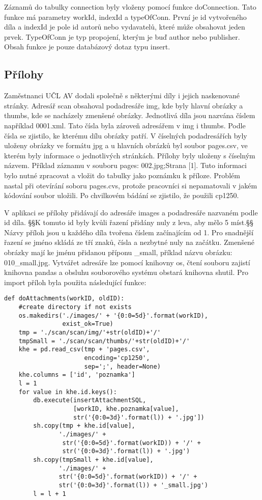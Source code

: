             Záznamů do tabulky connection byly vloženy pomocí funkce doConnection. Tato funkce má parametry workId, indexId a typeOfConn. První je id vytvořeného díla a indexId je pole id autorů nebo vydavatelů, které může obsahovat jeden prvek. TypeOfConn je typ propojení, kterým je buď author nebo publisher. Obsah funkce je pouze databázový dotaz typu insert.
            
        \subsection{Přílohy}
            Zaměstnanci UČL AV dodali společně s některými díly i jejich naskenované stránky. Adresář scan obsahoval  podadresáře img, kde byly hlavní obrázky a thumbs, kde se nacházely zmenšené obrázky. Jednotlivá díla jsou nazvána číslem například 0001.xml. Tato čísla byla zároveň adresářem v img i thumbs. Podle čísla se zjistilo, ke kterému dílu obrázky patří. V číselných podadresářích byly uloženy obrázky ve formátu jpg a u hlavních obrázků byl soubor pages.csv, ve kterém byly informace o jednotlivých stránkách. Přílohy byly uloženy s číselným názvem. Příklad záznamu v souboru pages: 002.jpg;Strana [1]. Tuto informaci bylo nutné zpracovat a vložit do tabulky jako poznámku k příloze. Problém nastal při otevírání soboru pages.cvs, protože pracovníci si nepamatovali v jakém kódování soubor uložili. Po chvilkovém bádání se zjistilo, že použili cp1250. 
            
            V aplikaci se přílohy přidávají do adresáře images a podadresáře nazvaném podle id díla. §§K tomuto id byly kvůli řazení přidány nuly z leva, aby mělo 5 míst.§§ Názvy příloh jsou u každého díla tvořena číslem začínajícím od 1. Pro snadnější řazení se jméno skládá ze tří znaků, čísla a nezbytné nuly na začátku. Zmenšené obrázky mají ke jménu přidanou příponu \_small, příklad názvu obrázku: 010\_small.jpg. Vytvářet adresáře lze pomocí knihovny os, čtení souboru zajistí knihovna pandas a obsluhu souborového systému obstará knihovna shutil. Pro import příloh byla použita následující funkce:

            \begin{verbatim}
def doAttachments(workID, oldID):
    #create directory if not exists
    os.makedirs('./images/' + '{0:0=5d}'.format(workID),
                exist_ok=True)
    tmp = './scan/scan/img/'+str(oldID)+'/'
    tmpSmall = './scan/scan/thumbs/'+str(oldID)+'/'
    khe = pd.read_csv(tmp + 'pages.csv',
                      encoding='cp1250',
                      sep=';', header=None)
    khe.columns = ['id', 'poznamka']
    l = 1
    for value in khe.id.keys():
        db.execute(insertAttachmentSQL,
                   [workID, khe.poznamka[value],
                   str('{0:0=3d}'.format(l)) + '.jpg'])
        sh.copy(tmp + khe.id[value], 
               './images/' + 
                str('{0:0=5d}'.format(workID)) + '/' +
                str('{0:0=3d}'.format(l)) + '.jpg')
        sh.copy(tmpSmall + khe.id[value], 
               './images/' + 
               str('{0:0=5d}'.format(workID)) + '/' +
               str('{0:0=3d}'.format(l)) + '_small.jpg')
        l = l + 1
            \end{verbatim}

